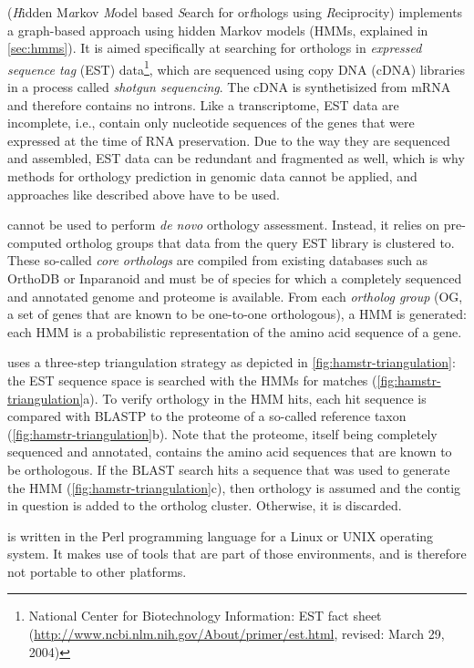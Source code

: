 \hamstr (\emph{H}idden M\emph{a}rkov \emph{M}odel based \emph{S}earch for
or\emph{t}hologs using \emph{R}eciprocity) implements a graph-based approach
using hidden Markov models (HMMs, explained in \autoref{sec:hmms}). It is aimed
specifically at searching for orthologs in \emph{expressed sequence tag} (EST)
data\footnote{National Center for Biotechnology Information: EST fact sheet
(\url{http://www.ncbi.nlm.nih.gov/About/primer/est.html}, revised: March 29,
2004)}, which are sequenced using copy DNA (cDNA) libraries in a process called
\emph{shotgun sequencing}. The cDNA is synthetisized from mRNA and therefore
contains no introns. Like a transcriptome, EST data are incomplete, i.e.,
contain only nucleotide sequences of the genes that were expressed at the time
of RNA preservation. Due to the way they are sequenced and assembled, EST data
can be redundant and fragmented as well, which is why methods for orthology
prediction in genomic data cannot be applied, and approaches like described
above have to be used.

\hamstr cannot be used to perform \emph{de novo} orthology assessment. Instead,
it relies on pre-computed ortholog groups that data from the query EST library
is clustered to. These so-called \emph{core orthologs} are compiled from
existing databases such as OrthoDB or Inparanoid and must be of species for
which a completely sequenced and annotated genome and proteome is available.
From each \emph{ortholog group} (OG, a set of genes that are known to be
one-to-one orthologous), a HMM is generated: each HMM is a probabilistic
representation of the amino acid sequence of a gene. 

\hamstr uses a three-step triangulation strategy as depicted in
\autoref{fig:hamstr-triangulation}: the EST sequence space is searched with the
HMMs for matches (\autoref{fig:hamstr-triangulation}a). To verify orthology in
the HMM hits, each hit sequence is compared with BLASTP \citep{altschul1997} to
the proteome of a so-called reference taxon
(\autoref{fig:hamstr-triangulation}b). Note that the proteome, itself being
completely sequenced and annotated, contains the amino acid sequences that are
known to be orthologous. If the BLAST search hits a sequence that was used to
generate the HMM (\autoref{fig:hamstr-triangulation}c), then orthology is
assumed and the contig in question is added to the ortholog cluster. Otherwise,
it is discarded.




%

\hamstr is written in the Perl programming language for a Linux or UNIX
operating system. It makes use of tools that are part of those environments, and
is therefore not portable to other platforms.
